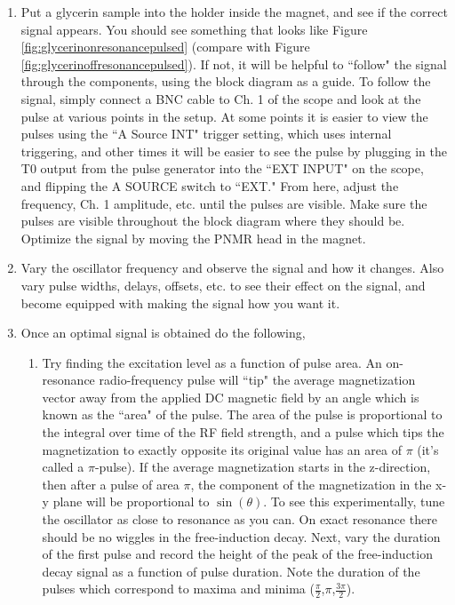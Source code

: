 \documentclass{../lab}
\begin{document}
\begin{enumerate}
    \item Put a glycerin sample into the holder inside the magnet, and see if the correct signal appears. You should see something that looks like Figure \ref{fig:glycerinonresonancepulsed} (compare with Figure \ref{fig:glycerinoffresonancepulsed}). If not, it will be helpful to ``follow" the signal through the components, using the block diagram as a guide. To follow the signal, simply connect a BNC cable to Ch. 1 of the scope and look at the pulse at various points in the setup. At some points it is easier to view the pulses using the ``A Source INT" trigger setting, which uses internal triggering, and other times it will be easier to see the pulse by plugging in the T0 output from the pulse generator into the ``EXT INPUT" on the scope, and flipping the A SOURCE switch to ``EXT." From here, adjust the frequency, Ch. 1 amplitude, etc. until the pulses are visible. Make sure the pulses are visible throughout the block diagram where they should be. Optimize the signal by moving the PNMR head in the magnet.
    \item Vary the oscillator frequency and observe the signal and how it changes. Also vary pulse widths, delays, offsets, etc. to see their effect on the signal, and become equipped with making the signal how you want it.
    \item Once an optimal signal is obtained do the following,
    \begin{enumerate}
        \item Try finding the excitation level as a function of pulse area. An on-resonance radio-frequency pulse will ``tip" the average magnetization vector away from the applied DC magnetic field by an angle which is known as the ``area" of the pulse. The area of the pulse is proportional to the integral over time of the RF field strength, and a pulse which tips the magnetization to exactly opposite its original value has an area of $\pi$ (it's called a $\pi$-pulse). If the average magnetization starts in the z-direction, then after a pulse of area $\pi$, the component of the magnetization in the x-y plane will be proportional to $\sin(\theta)$. To see this experimentally, tune the oscillator as close to resonance as you can. On exact resonance there should be no wiggles in the free-induction decay. Next, vary the duration of the first pulse and record the height of the peak of the free-induction decay signal as a function of pulse duration. Note the duration of the pulses which correspond to maxima and minima ($\frac{\pi}{2}$,$\pi$,$\frac{3\pi}{2}$).

\end{enumerate}
\end{enumerate}
\end{document}
